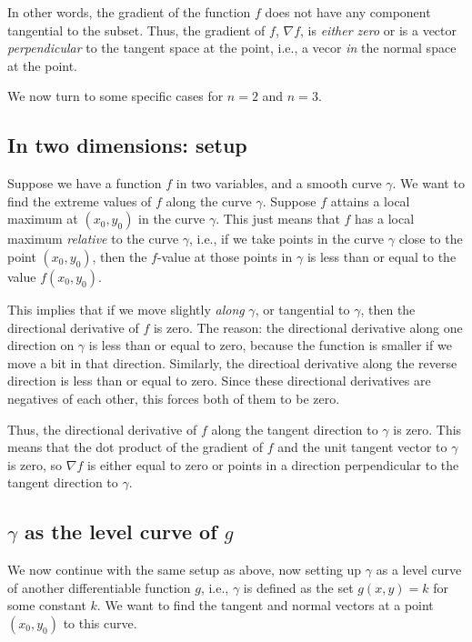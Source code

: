 \documentclass[10pt]{amsart}
\begin{document}
In other words, the gradient of the function $f$ does not have any
component tangential to the subset. Thus, the gradient of $f$, $\nabla
f$, is {\em either zero} or is a vector {\em perpendicular} to the
tangent space at the point, i.e., a vecor {\em in} the normal space at
the point.

We now turn to some specific cases for $n = 2$ and $n = 3$.

\subsection{In two dimensions: setup}

Suppose we have a function $f$ in two variables, and a smooth curve
$\gamma$. We want to find the extreme values of $f$ along the curve
$\gamma$. Suppose $f$ attains a local maximum at $(x_0,y_0)$ in the
curve $\gamma$. This just means that $f$ has a local maximum {\em
relative} to the curve $\gamma$, i.e., if we take points in the curve
$\gamma$ close to the point $(x_0,y_0)$, then the $f$-value at those
points in $\gamma$ is less than or equal to the value $f(x_0,y_0)$.

This implies that if we move slightly {\em along} $\gamma$, or
tangential to $\gamma$, then the directional derivative of $f$ is
zero. The reason: the directional derivative along one direction on
$\gamma$ is less than or equal to zero, because the function is
smaller if we move a bit in that direction. Similarly, the directioal
derivative along the reverse direction is less than or equal to
zero. Since these directional derivatives are negatives of each other,
this forces both of them to be zero.

Thus, the directional derivative of $f$ along the tangent direction to
$\gamma$ is zero. This means that the dot product of the gradient of
$f$ and the unit tangent vector to $\gamma$ is zero, so $\nabla f$ is
either equal to zero or points in a direction perpendicular to the
tangent direction to $\gamma$.

\subsection{$\gamma$ as the level curve of $g$}

We now continue with the same setup as above, now setting up $\gamma$
as a level curve of another differentiable function $g$, i.e.,
$\gamma$ is defined as the set $g(x,y) = k$ for some constant $k$. We
want to find the tangent and normal vectors at a point $(x_0,y_0)$ to
this curve.
\end{document}
